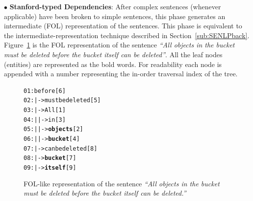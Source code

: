 {\small $\bullet$} \textbf{Stanford-typed Dependencies}: After complex sentences (whenever applicable) have been broken to simple sentences, this phase generates an intermediate (FOL) representation of the sentences. This phase is equivalent to the intermediate-representation technique described in Section~\ref{sub:SENLPback}. Figure~\ref{fig:FOLTree} is the FOL representation of the sentence \textit{``All objects in the bucket must be deleted before the bucket itself can be deleted''}. All the leaf nodes (entities) are represented as the bold words. For readability each node is appended with a number representing the in-order traversal index of the tree. 

\begin{figure}
	\begin{CodeOut}
		\begin{alltt}
			\hspace*{0.8in}01:before[6]
			\hspace*{0.8in}02:|->must be deleted[5]
			\hspace*{0.8in}03:\hspace*{0.2in}|->All[1]
			\hspace*{0.8in}04:\hspace*{0.2in}|\hspace*{0.2in}|->in[3]
			\hspace*{0.8in}05:\hspace*{0.2in}|\hspace*{0.4in}|->\textbf{objects}[2]
			\hspace*{0.8in}06:\hspace*{0.2in}|\hspace*{0.4in}|->\textbf{bucket}[4]
			\hspace*{0.8in}07:\hspace*{0.2in}|->can be deleted[8]
			\hspace*{0.8in}08:\hspace*{0.4in}|->\textbf{bucket}[7]
			\hspace*{0.8in}09:\hspace*{0.4in}|->\textbf{itself}[9]
		\end{alltt}
	\end{CodeOut}
	\vspace*{-3ex}
	\caption{\label{fig:FOLTree} FOL-like representation of the sentence \textit{``All objects in the bucket must be deleted before the bucket itself can be deleted.''}}
	\vspace*{-3ex}
	
\end{figure}

